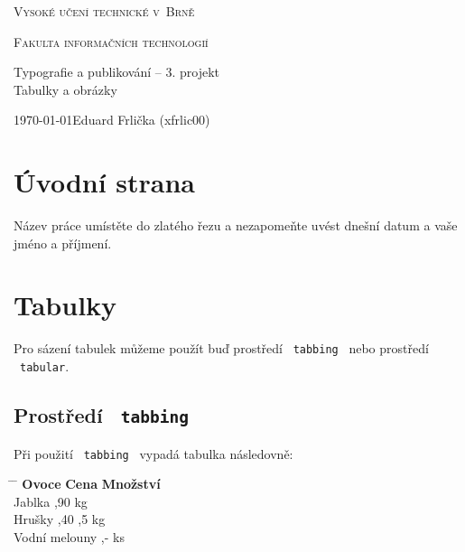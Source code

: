 \documentclass[11pt]{article}
\begin{document}
\begin{titlepage}

\begin{center}

\textsc{ \Huge Vysoké učení technické v~Brně\\}

\textsc{\huge Fakulta informačních technologií\\}

 
{\LARGE Typografie a publikování – 3. projekt \\ }
{\Huge Tabulky a obrázky \\}
\end{center}
{\large \today \hfill Eduard Frlička (xfrlic00)}
\end{titlepage}


\section{Úvodní strana}
Název práce umístěte do zlatého řezu a nezapomeňte uvést dnešní datum a vaše jméno a příjmení.

\section{Tabulky}
Pro sázení tabulek můžeme použít buď prostředí \ \texttt{tabbing} \ nebo prostředí \ \texttt{tabular}.

\subsection{Prostředí \ \texttt{tabbing}}
Při použití \ \texttt{tabbing} \ vypadá tabulka následovně:




\begin{tabbing}
    \hspace{2.75cm}     \= \hspace{1.25cm}   \= \hspace{1.25cm}     \kill
    \textbf{Ovoce} \> \textbf{Cena} \> \textbf{Množství} \\
    Jablka ,90  kg \\
    Hrušky ,40 ,5 kg\\
    Vodní melouny ,-  ks\\
\end{tabbing}
\end{document}
